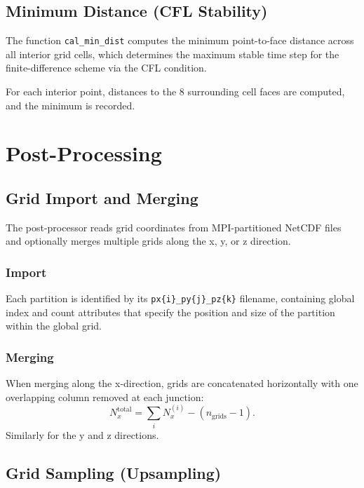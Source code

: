 \documentclass[11pt,a4paper]{report}
\begin{document}
\section{Minimum Distance (CFL Stability)}

The function \texttt{cal\_min\_dist} computes the minimum point-to-face distance across all interior grid cells, which determines the maximum stable time step for the finite-difference scheme via the CFL condition.

For each interior point, distances to the 8 surrounding cell faces are computed, and the minimum is recorded.

\chapter{Post-Processing}

\section{Grid Import and Merging}

The post-processor reads grid coordinates from MPI-partitioned NetCDF files and optionally merges multiple grids along the x, y, or z direction.

\subsection{Import}

Each partition is identified by its \texttt{px\{i\}\_py\{j\}\_pz\{k\}} filename, containing global index and count attributes that specify the position and size of the partition within the global grid.

\subsection{Merging}

When merging along the x-direction, grids are concatenated horizontally with one overlapping column removed at each junction:
\begin{equation}
    N_x^{\text{total}} = \sum_i N_x^{(i)} - (n_{\text{grids}} - 1).
\end{equation}
Similarly for the y and z directions.

\section{Grid Sampling (Upsampling)}
\end{document}
